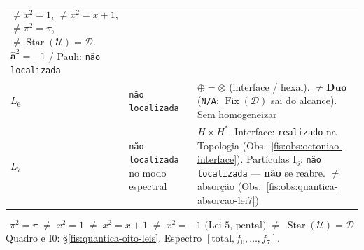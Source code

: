 \documentclass[livro.tex]{subfiles}
\begin{document}
\begin{observacao}[oito leis no palco: \(e_k=\) Lei~$k$; pental \(\neq\) estrela]
\begin{center}
\begin{tabular}{@{}>{\raggedright\arraybackslash}p{}
                >{\raggedright\arraybackslash}p{}
                >{\raggedright\arraybackslash}p{}@{}}
    \(\neq x^{2}=1\),
    \(\neq x^{2}=x+1\),
    \(\neq\pi^{2}=\pi\),
    \(\neq\operatorname{Star}(\mathcal{U})=\mathcal{D}\).
    \(\hat{\mathbf{a}}^{2}=-1\) / Pauli:
    \texttt{não localizada} \\
\(L_6\)
  & \texttt{não localizada}
  & \(\oplus=\otimes\)
    (interface / hexal).
    \(\neq\mathbf{Duo}\)
    (\texttt{N/A}:
    \(\operatorname{Fix}(\mathcal{D})\)
    sai do alcance).
    Sem homogeneizar \\
\(L_7\)
  & \texttt{não localizada}
    no modo espectral
  & \(H\times H^{*}\).
    Interface:
    \texttt{realizado}
    na Topologia
    (Obs.~\ref{fis:obs:octoniao-interface}).
    Partículas \(\mathrm{I}_{6}\):
    \texttt{não localizada}
    --- \textbf{não} se reabre.
    \(\neq\) absorção
    (Obs.~\ref{fis:obs:quantica-absorcao-lei7}) \\
\bottomrule
\end{tabular}
\end{center}
\[
\boxed{\;
\pi^{2}=\pi
\;\neq\;
x^{2}=1
\;\neq\;
x^{2}=x+1
\;\neq\;
x^{2}=-1
\text{ (Lei~5, pental)}
\;\neq\;
\operatorname{Star}(\mathcal{U})=\mathcal{D}
\;}
\]
Quadro e I0: §\ref{fis:quantica-oito-leis}.
Espectro \([\mathrm{total},f_0,\ldots,f_7]\).
\end{observacao}
\end{document}
